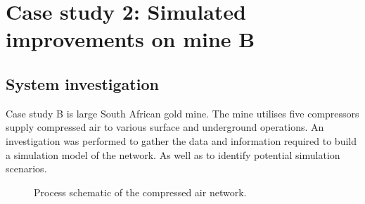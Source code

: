 \section{Case study 2: Simulated improvements on mine B}
	\subsection{System investigation}
	Case study B is large South African gold mine. The mine utilises five compressors supply compressed air to various surface and underground operations. An investigation was performed to gather the data and information required to build a simulation model of the network. As well as to identify potential simulation scenarios.
	\par 
	\begin{figure}[h!]
		\centering
		\caption{Process schematic of the compressed air network.}
		\label{fig: KUS Air layout}
	\end{figure}
